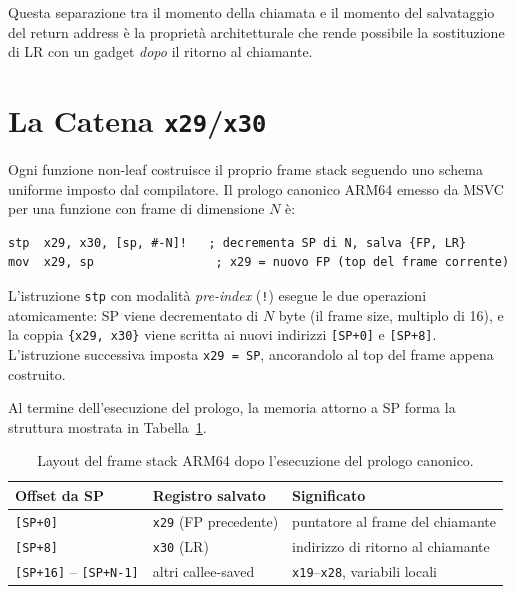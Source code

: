 Questa separazione tra il momento della chiamata e il momento del salvataggio
del return address è la proprietà architetturale che rende possibile la
sostituzione di LR con un gadget \emph{dopo} il ritorno al chiamante.


\section{La Catena \texttt{x29}/\texttt{x30}}

Ogni funzione non-leaf costruisce il proprio frame stack seguendo uno schema
uniforme imposto dal compilatore. Il prologo canonico ARM64 emesso da MSVC
per una funzione con frame di dimensione $N$ è:

\begin{lstlisting}[style=asmstyle, language=ARM64, caption={Prologo canonico ARM64 Windows: salvataggio di FP e LR, costruzione del frame pointer}, label={lst:intro-prolog}]
stp  x29, x30, [sp, #-N]!   ; decrementa SP di N, salva {FP, LR}
mov  x29, sp                 ; x29 = nuovo FP (top del frame corrente)
\end{lstlisting}

L'istruzione \texttt{stp} con modalità \emph{pre-index} (\texttt{!}) esegue
le due operazioni atomicamente: SP viene decrementato di $N$ byte (il frame
size, multiplo di 16), e la coppia \texttt{\{x29, x30\}} viene scritta ai
nuovi indirizzi \texttt{[SP+0]} e \texttt{[SP+8]}. L'istruzione successiva
imposta \texttt{x29 = SP}, ancorandolo al top del frame appena costruito.

Al termine dell'esecuzione del prologo, la memoria attorno a SP forma la
struttura mostrata in Tabella~\ref{tab:frame-layout}.

\begin{table}[H]
\centering
\begin{tabular}{lll}
\toprule
Offset da SP & Registro salvato & Significato \\
\midrule
\texttt{[SP+0]} & \texttt{x29} (FP precedente) & puntatore al frame del chiamante \\
\texttt{[SP+8]} & \texttt{x30} (LR)            & indirizzo di ritorno al chiamante \\
\texttt{[SP+16]} -- \texttt{[SP+N-1]} & altri callee-saved & \texttt{x19}--\texttt{x28}, variabili locali \\
\bottomrule
\end{tabular}
\caption{Layout del frame stack ARM64 dopo l'esecuzione del prologo canonico.}
\label{tab:frame-layout}
\end{table}

